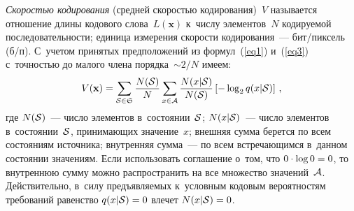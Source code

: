 \begin{multicols}{2}
\textit{Скоростью кодирования} (средней скоростью кодирования)~$V$ называется отношение 
длины кодового слова~$L(\mathbf{x})$ к~числу элементов~$N$ кодируемой 
последовательности; единица измерения скорости кодирования~--- 
бит/пик\-сель (б/п). С~учетом принятых предположений 
из формул~(\ref{eq1}) и~(\ref{eq3}) с~точностью до малого члена порядка~$\sim 2/N$ 
имеем:
\begin{equation}
\label{eq4}
V(\mathbf{x}) = \sum\limits_{{\cal S}\in{\frak S}}\displaystyle\frac{\displaystyle N({\cal S})\mathstrut}{\displaystyle N\mathstrut}
\sum\limits_{x\in{\cal A}}\displaystyle\frac{\displaystyle N(x|{\cal S})\mathstrut}{\displaystyle N({\cal S})\mathstrut} 
\left[-\log_{2}q(x|{\cal S})\right]\,,
\end{equation}
где $N({\cal S})$~--- число элементов в~состоянии~${\cal S}$; $N(x|{\cal S})$~--- 
число элементов в~состоянии~${\cal S}$, принимающих значение~$x$; внешняя 
сумма берется по всем состояниям источника; внутренняя сумма~--- 
по всем встречающимся в~данном состоянии значениям. Если использовать соглашение о~том, 
что $0\cdot\log0\hm=0$, то внутреннюю сумму можно распространить на 
все множество значений~$\cal A$. Действительно, в~силу предъявляемых 
к~условным кодовым вероятностям требований равенство $q(x|{\cal S})\hm=0$ 
влечет $N(x|{\cal S})\hm=0$.


\end{multicols}
